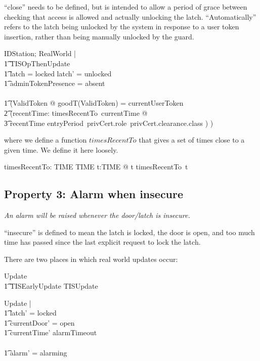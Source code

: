 ``close'' needs to be defined,
but is intended to allow a period of grace between checking that access is allowed and
actually unlocking the latch.
``Automatically'' refers to the latch being unlocked by the system in response to a user token
insertion,
rather than being manually unlocked by the guard.

\begin{zed}
\Delta IDStation; \Delta RealWorld |
\\ \t1	TISOpThenUpdate
\\ \t1	\land latch = locked \land latch' = unlocked
\\ \t1	\land adminTokenPresence = absent
\\ \shows
\\ \t1	(\exists ValidToken @ goodT(\theta ValidToken) = currentUserToken
\\ \t2	\land
		(\exists recentTime: timesRecentTo~currentTime @
\\ \t3			recentTime \in entryPeriod~privCert.role~privCert.clearance.class
		)
	)
\end{zed}

where we define a function $timesRecentTo$
that gives a set of times close to a given time.
We define it here loosely.
\begin{axdef}
	timesRecentTo: TIME \fun \power TIME
\where
	\forall t:TIME @ t \in timesRecentTo~t
\end{axdef}
\subsection{Property 3: Alarm when insecure}
\label{sec:AlarmProp}
{\em An alarm will be raised whenever the door/latch is insecure.
}

``insecure'' is defined to mean the latch is locked,
the door is open,
and too much time has passed since the last explicit request to lock the latch.

There are two places in which real world updates occur:
\begin{zed}
	Update  
\\ \t1		TISEarlyUpdate \lor TISUpdate
\end{zed}
\begin{zed}
Update |
\\ \t1	latch' = locked 
\\ \t1	\land currentDoor' = open
\\ \t1	\land currentTime' \geq alarmTimeout
\\ \shows
\\ \t1	alarm' = alarming
\end{zed}

